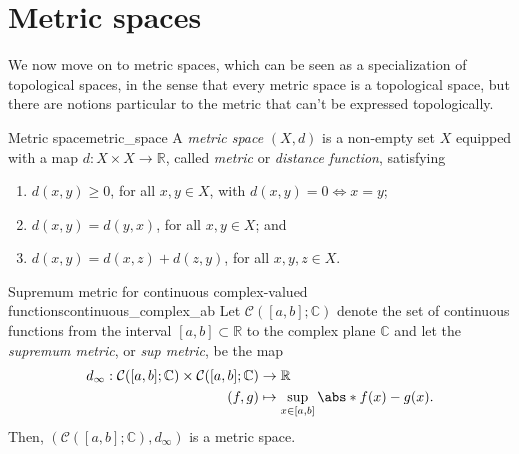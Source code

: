 \section{Metric spaces}
We now move on to metric spaces, which can be seen as a specialization of topological spaces, in the sense that every metric space is a topological space, but there are notions particular to the metric that can't be expressed topologically.
\begin{definition}{Metric space}{metric_space}
    A \emph{metric space} \((X, d)\) is a non-empty set \(X\) equipped with a map \(d : X \times X \to \mathbb{R}\), called \emph{metric} or \emph{distance function}, satisfying
    \begin{enumerate}[label=(\alph*)]
        \item \(d(x, y) \geq 0\), for all \(x, y \in X\), with \(d(x, y) = 0 \iff x = y\);
        \item \(d(x, y) = d(y, x)\), for all \(x, y \in X\); and
        \item \(d(x, y) = d(x, z) + d(z, y)\), for all \(x,y,z \in X\).
    \end{enumerate}
\end{definition}
\begin{example}{Supremum metric for continuous complex-valued functions}{continuous_complex_ab}
    Let \(\mathcal{C}([a,b];\mathbb{C})\) denote the set of continuous functions from the interval \([a,b]\subset \mathbb{R}\) to the complex plane \(\mathbb{C}\) and let the \emph{supremum metric}, or \emph{sup metric}, be the map
    \begin{align*}
        d_\infty : \mathcal{C}([a,b];\mathbb{C}) \times \mathcal{C}([a,b];\mathbb{C}) &\to \mathbb{R}\\
        (f, g) &\mapsto \sup_{x\in[a,b]}\abs*{f(x) - g(x)}.
    \end{align*}
    Then, \((\mathcal{C}([a,b];\mathbb{C}), d_\infty)\) is a metric space.
\end{example}

